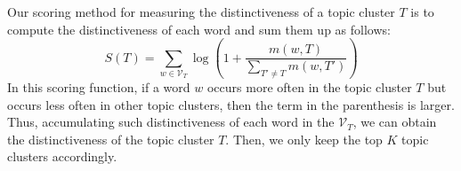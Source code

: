 Our scoring method for measuring the distinctiveness of a topic cluster $T$ is to compute the distinctiveness of each word and sum them up as follows:
\begin{equation}
 S(T) = \sum_{w \in \mathcal{V}_T} \log\left( 1 + \frac{m(w,T)}{\sum \limits_{T' \neq T} m(w, T')} \right) 
\end{equation}
In this scoring function, if a word $w$ occurs more often in 
the topic cluster $T$ but occurs less often in other topic clusters, 
then the term in the parenthesis is larger. 
Thus, accumulating such distinctiveness of  each word in 
the $\mathcal{V}_T$, we can obtain the distinctiveness of the topic 
cluster $T$. Then, we only keep the top $K$ topic clusters accordingly.

%
%
%
%
%
%
%
%
%

